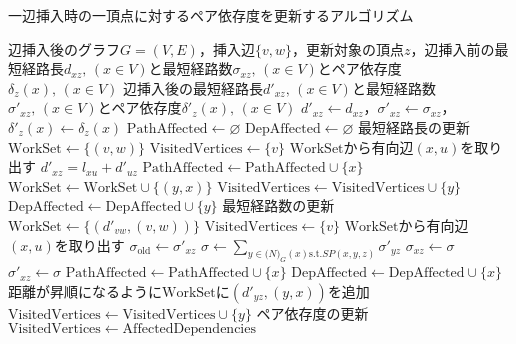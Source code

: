 \begin{algorithm}[H]
  \caption{一辺挿入時の一頂点に対するペア依存度を更新するアルゴリズム}
  \label{algo:update-pd-on-insert}
  \begin{algorithmic}[1]
    \Require 辺挿入後のグラフ$G=(V,E)$，挿入辺$\{v,w\}$，更新対象の頂点$z$，辺挿入前の最短経路長$d_{xz},\,(x\in V)$と最短経路数$\sigma_{xz},\,(x\in V)$とペア依存度$\delta_z(x),\,(x\in V)$
    \Ensure 辺挿入後の最短経路長$d'_{xz},\,(x\in V)$と最短経路数$\sigma'_{xz},\,(x\in V)$とペア依存度$\delta'_z(x),\,(x\in V)$
    \State $d'_{xz}\gets d_{xz}$，$\sigma'_{xz}\gets\sigma_{xz}$，$\delta'_z(x)\gets\delta_z(x)$
    \State $\mathrm{PathAffected}\gets\varnothing$
    \State $\mathrm{DepAffected}\gets\varnothing$
    \State\Comment 最短経路長の更新
    \State $\mathrm{WorkSet}\gets\{(v,w)\}$
    \State $\mathrm{VisitedVertices}\gets\{v\}$
    \State $\mathrm{WorkSet}$から有向辺$(x,u)$を取り出す
    \State $d'_{xz}=l_{xu}+d'_{uz}$
    \State $\mathrm{PathAffected}\gets\mathrm{PathAffected}\cup\{x\}$
    \State $\mathrm{WorkSet}\gets\mathrm{WorkSet}\cup\{(y,x)\}$
    \State $\mathrm{VisitedVertices}\gets\mathrm{VisitedVertices}\cup\{y\}$
    \EndFor
    \State $\mathrm{DepAffected}\gets\mathrm{DepAffected}\cup\{y\}$
    \EndFor
    \EndIf
    \EndWhile
    \State\Comment 最短経路数の更新
    \State $\mathrm{WorkSet}\gets\{(d'_{vw}, (v, w))\}$
    \State $\mathrm{VisitedVertices}\gets\{v\}$
    \State $\mathrm{WorkSet}$から有向辺$(x,u)$を取り出す
    \State $\sigma_{\mathrm{old}}\gets\sigma'_{xz}$
    \State $\sigma\gets\sum_{y\in \mathcal(N)_G(x)\mathrm{s.t.}SP(x,y,z)}\sigma'_{yz}$
    \State $\sigma_{xz}\gets\sigma$
    \State $\sigma'_{xz}\gets\sigma$
    \State $\mathrm{PathAffected}\gets\mathrm{PathAffected}\cup\{x\}$
    \State $\mathrm{DepAffected}\gets\mathrm{DepAffected}\cup\{x\}$
    \State 距離が昇順になるように$\mathrm{WorkSet}$に$(d'_{yz},(y,x))$を追加
    \State $\mathrm{VisitedVertices}\gets\mathrm{VisitedVertices}\cup\{y\}$
    \EndFor
    \EndIf
    \EndWhile
    \State\Comment ペア依存度の更新
    \State $\mathrm{VisitedVertices}\gets\mathrm{AffectedDependencies}$

\end{algorithmic}
\end{algorithm}
